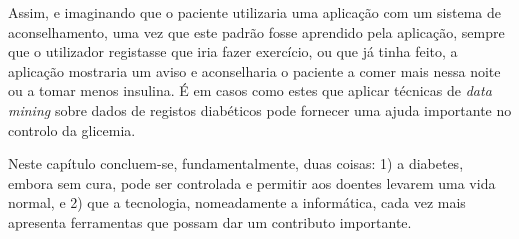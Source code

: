 Assim, e imaginando que o paciente utilizaria uma aplicação com um sistema de aconselhamento, uma vez que este padrão fosse aprendido pela aplicação, sempre que o utilizador registasse que iria fazer exercício, ou que já tinha feito, a aplicação mostraria um aviso e aconselharia o paciente a comer mais nessa noite ou a tomar menos insulina. É em casos como estes que aplicar técnicas de \textit{data mining} sobre dados de registos diabéticos pode fornecer uma ajuda importante no controlo da glicemia.\newline

Neste capítulo concluem-se, fundamentalmente, duas coisas: 1) a diabetes, embora sem cura, pode ser controlada e permitir aos doentes levarem uma vida normal, e 2) que a tecnologia, nomeadamente a informática, cada vez mais apresenta ferramentas que possam dar um contributo importante. 

